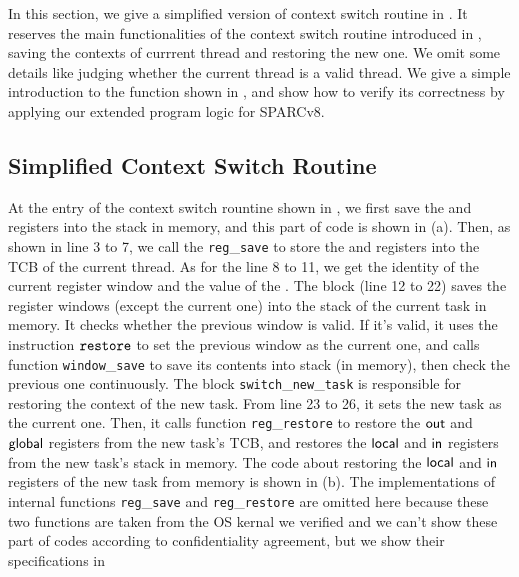 In this section, we give a simplified version of context switch routine in 
\Fig{\ref{fig:Main function of context switch routine}}. It reserves the 
main functionalities of the context switch routine introduced in 
\Sec{\ref{sec:ctxswitch}}, \eg saving the contexts of currrent thread 
and restoring the new one. We omit some details like judging whether the 
current thread is a valid thread. We give a simple introduction to the 
function shown in \Fig{\ref{fig:Main function of context switch routine}}, 
and show how to verify its correctness by applying our extended program 
logic for SPARCv8. 

\subsection{Simplified Context Switch Routine}

At the entry of the context switch rountine shown in
\Fig{\ref{fig:Main function of context switch routine}}, we first 
save the \localRN{} and \inRN{} registers into the stack in memory, 
and this part of code is shown in 
\Fig{\ref{fig:code for saving and restoring local and in}}(a). 
Then, as shown in line 3 to 7, we call the \texttt{reg}\_\texttt{save}  
to store the \outRN{} and \globalRN{} registers into the TCB 
of the current thread. As for the line 8 to 11, we get the identity of 
the current register window and the value of the \regwim{}. 
The block \SaveUsedWin (line 12 to 22) saves the register windows 
(except the current one) into the stack of the current task in memory. 
It checks whether the previous window is valid. If it's valid, it 
uses the instruction $\texttt{restore}{}$ to set the previous window as the 
current one, and calls function \texttt{window}\_\texttt{save} to 
save its contents into stack (in memory), then check the previous 
one continuously. 
The block \texttt{switch}\_\texttt{new}\_\texttt{task} is responsible 
for restoring the context of the new task. From line 23 to 26, it 
sets the new task as the current one. Then, it calls function 
\texttt{reg}\_\texttt{restore} to restore the $\textsf{out}$ and $\textsf{global}$ 
registers from the new task's TCB, and restores the  
$\textsf{local}$ and $\textsf{in}$ registers from the new task's stack in memory. 
The code about restoring the $\textsf{local}$ and $\textsf{in}$ registers of 
the new task from memory is shown in 
\Fig{\ref{fig:code for saving and restoring local and in}}(b). 
The implementations of internal functions
\texttt{reg}\_\texttt{save} and \texttt{reg}\_\texttt{restore} 
are omitted here because these two functions are taken 
from the OS kernal we verified and we can't show these part 
of codes according to confidentiality agreement, but we show 
their specifications in \Fig{\ref{fig:Specifications of Internal Functions}}

